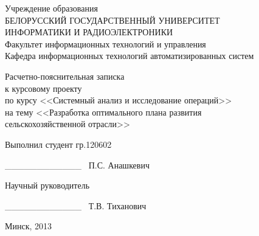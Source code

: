 \thispagestyle{empty}

\begin{center}
  Учреждение образования \\
  БЕЛОРУССКИЙ ГОСУДАРСТВЕННЫЙ УНИВЕРСИТЕТ \\
  ИНФОРМАТИКИ И РАДИОЭЛЕКТРОНИКИ \\
  \vspace{0.5em}
  Факультет информационных технологий и управления \\
  \vspace{0.5em}
  Кафедра информационных технологий автоматизированных систем \\
\end{center}

\vspace{50mm}

\begin{center}
  Расчетно-пояснительная записка \\
  к курсовому проекту \\
  по курсу <<Системный анализ и исследование операций>> \\
  на тему <<Разработка оптимального плана развития \\сельскохозяйственной отрасли>> \\
\end{center}

\vspace{50mm}

\begin{multicols}{2}\columnsep=500mm
  \begin{flushleft}
    Выполнил студент гр.120602 \\
  \end{flushleft}
  \columnbreak
  \begin{flushright}
   \_\_\_\_\_\_\_\_\_\_\_\_\   \hspace{5.5mm}  П.С. Анашкевич \\
  \end{flushright}
\end{multicols}

\begin{multicols}{2}\columnsep=500mm
  \begin{flushleft}
    Научный руководитель \\
  \end{flushleft}
  \columnbreak
  \begin{flushright}
   \_\_\_\_\_\_\_\_\_\_\_\_\   \hspace{8mm}  Т.В. Тиханович \\
  \end{flushright}
\end{multicols}

\vspace{40mm}

\begin{center}
Минск, 2013
\end{center}

\newpage